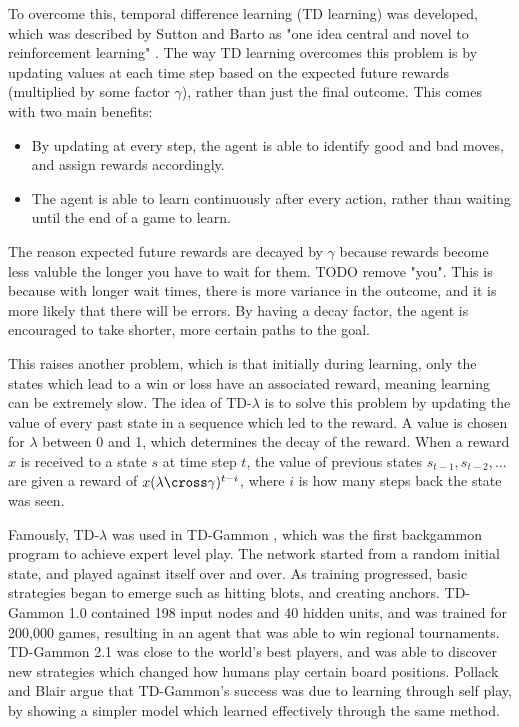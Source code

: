 To overcome this, temporal difference learning (TD learning) was developed, which was described by Sutton and Barto as "one idea central and novel to reinforcement learning" \cite{Sutton2018}.
The way TD learning overcomes this problem is by updating values at each time step based on the expected future rewards (multiplied by some factor $\gamma$), rather than just the final outcome. This comes with two main benefits:
\begin{itemize}
    \item By updating at every step, the agent is able to identify good and bad moves, and assign rewards accordingly.
    \item The agent is able to learn continuously after every action, rather than waiting until the end of a game to learn.
\end{itemize}
The reason expected future rewards are decayed by $\gamma$ because rewards become less valuble the longer you have to wait for them. TODO remove "you".
This is because with longer wait times, there is more variance in the outcome, and it is more likely that there will be errors. 
By having a decay factor, the agent is encouraged to take shorter, more certain paths to the goal.

This raises another problem, which is that initially during learning, only the states which lead to a win or loss have an associated reward, meaning learning can be extremely slow.
The idea of TD-$\lambda$ is to solve this problem by updating the value of every past state in a sequence which led to the reward.
A value is chosen for $\lambda$ between 0 and 1, which determines the decay of the reward.
When a reward $x$ is received to a state $s$ at time step $t$, the value of previous states $s_{t-1}, s_{t-2}, ...$ are given a reward of $x (\lambda \cross \gamma)^{t - i}$, where $i$ is how many steps back the state was seen.

Famously, TD-$\lambda$ was used in TD-Gammon \cite{Tesauro1995}, which was the first backgammon program to achieve expert level play.
The network started from a random initial state, and played against itself over and over. 
As training progressed, basic strategies began to emerge such as hitting blots, and creating anchors. 
TD-Gammon 1.0 contained 198 input nodes and 40 hidden units, and was trained for 200,000 games, resulting in an agent that was able to win regional tournaments.
TD-Gammon 2.1 was close to the world's best players, and was able to discover new strategies which changed how humans play certain board positions.
Pollack and Blair \cite{Pollack1997} argue that TD-Gammon's success was due to learning through self play, by showing a simpler model which learned effectively through the same method. 

